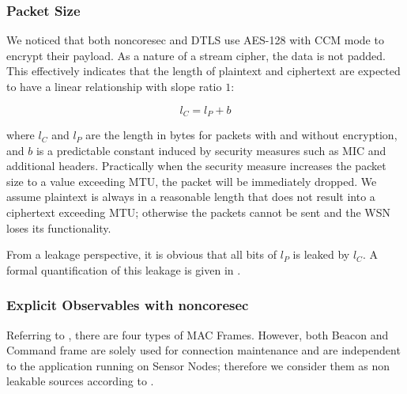 \subsubsection{Packet Size}


We noticed that both noncoresec and DTLS use AES-128 with CCM mode to encrypt their payload. As a nature of a stream cipher, the data is not padded. This effectively indicates that the length of plaintext and ciphertext are expected to have a linear relationship with slope ratio $1$:

\begin{equation} \label{Eq: Linear Length}
	l_{C} = l_{P} + b
\end{equation}

where $l_{C}$ and $l_{P}$ are the length in bytes for packets with and without encryption, and $b$ is a predictable constant induced by security measures such as MIC and additional headers. Practically when the security measure increases the packet size to a value exceeding MTU, the packet will be immediately dropped. We assume plaintext is always in a reasonable length that does not result into a ciphertext exceeding MTU; otherwise the packets cannot be sent and the WSN loses its functionality.

From a leakage perspective, it is obvious that all bits of $l_P$ is leaked by $l_C$. A formal quantification of this leakage is given in .

\subsubsection{Explicit Observables with noncoresec}

Referring to , there are four types of MAC Frames. However, both Beacon and Command frame are solely used for connection maintenance and are independent to the application running on Sensor Nodes; therefore we consider them as non leakable sources according to .


